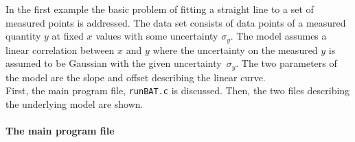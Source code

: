 \documentclass[11pt, a4paper]{article}
\begin{document}
In the first example the basic problem of fitting a straight line to a
set of measured points is addressed. The data set consists of data
points of a measured quantity $y$ at fixed $x$ values with some
uncertainty $\sigma_{y}$. The model assumes a linear correlation
between $x$ and $y$ where the uncertainty on the measured $y$ is
assumed to be Gaussian with the given uncertainty~$\sigma_{y}$. The
two parameters of the model are the slope and offset describing the
linear curve. \\

\noindent 
First, the main program file, \verb|runBAT.c| is discussed. Then, the
two files describing the underlying model are shown. \\ 

\pagebreak 

\paragraph{The main program file} 
% 
\end{document}
